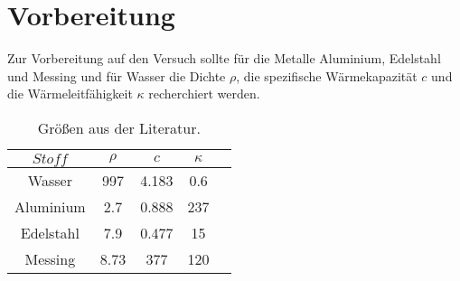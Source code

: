 \section{Vorbereitung} \label{sec:vorbereitung}

    Zur Vorbereitung auf den Versuch sollte für die Metalle
    Aluminium, Edelstahl und Messing und für Wasser die Dichte $\rho$,
    die spezifische Wärmekapazität $c$ und die Wärmeleitfähigkeit $\kappa$ 
    recherchiert werden.

   \begin{table}
        \centering
        \caption{Größen aus der Literatur.}
        \label{tab:daten_vorbereitung}
        \begin{tabular}{c c c c c}
         \toprule
         $Stoff$ & $\rho$ & $c$ & $\kappa$ \\
         \midrule
         Wasser & 997 & 4.183 & 0.6 \\ %
         Aluminium & 2.7 & 0.888 & 237 \\ %
         Edelstahl & 7.9 & 0.477 & 15 \\ %
         Messing & 8.73 & 377 & 120 \\ %
         \bottomrule
        \end{tabular}
   \end{table}